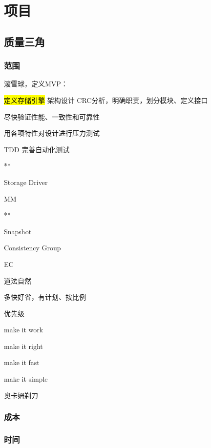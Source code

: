 \chapter{项目}

\section{质量三角}


\subsection{范围}

滚雪球，定义MVP：
\begin{enumbox}
\item \hl{定义存储引擎} 架构设计 CRC分析，明确职责，划分模块、定义接口
\item 尽快验证性能、一致性和可靠性
\item 用各项特性对设计进行压力测试
\item TDD 完善自动化测试
\item ***
\item Storage Driver
\item MM
\item ***
\item Snapshot
\item Consistency Group
\item EC
\end{enumbox}

道法自然

多快好省，有计划、按比例

优先级
\begin{enumbox}
\item make it work
\item make it right
\item make it fast
\item make it simple
\end{enumbox}

奥卡姆剃刀

\subsection{成本}

\subsection{时间}

